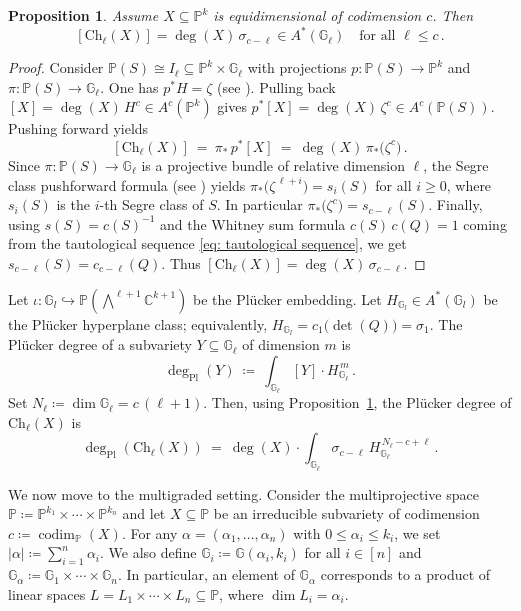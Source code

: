 \documentclass[12pt]{article}
\newtheorem{proposition}[theorem]{Proposition}
\theoremstyle{definition}
\newcommand{\C}{{\mathbb C}}
\newcommand{\G}{{\mathbb G}}
\newcommand{\PP}{{\mathbb P}}
\def\codim{\operatorname{codim}}
\begin{document}
\begin{proposition}\label{prop:class-single}
Assume $X\subseteq \PP^k$ is equidimensional of codimension $c$. Then
\[
    [\mathrm{Ch}_\ell(X)] = \deg(X)\,\sigma_{c-\ell}\in A^*(\G_\ell)\quad\text{for all $\ell\le c$}\,.
\]
\end{proposition}
\begin{proof}
Consider $\PP(S)\cong I_\ell \subseteq \PP^k\times\G_\ell$ with projections $p\colon\PP(S)\to \PP^k$ and $\pi\colon\PP(S)\to\G_\ell$.
One has $p^*H=\zeta$ (see \cite[Section 9.3.1]{EH}).
Pulling back $[X]=\deg(X)\,H^c\in A^c(\PP^k)$ gives $p^*[X] = \deg(X)\,\zeta^c\in A^c(\PP(S))$. Pushing forward yields
\[
    [\mathrm{Ch}_\ell(X)] \ =\  \pi_*\, p^*[X] \ =\  \deg(X)\,\pi_*\bigl(\zeta^c\bigr)\,.
\]
Since $\pi\colon\PP(S)\to\G_\ell$ is a projective bundle of relative dimension $\ell$, the Segre class pushforward formula (see \cite[\S3.3 and \S14]{fulton1998intersection}) yields $\pi_*\bigl(\zeta^{\,\ell+i}\bigr)= s_i(S)$ for all $i\ge 0$, where $s_i(S)$ is the $i$-th Segre class of $S$.
In particular $\pi_*\bigl(\zeta^c\bigr)= s_{c-\ell}(S)$.
Finally, using $s(S)=c(S)^{-1}$ and the Whitney sum formula $c(S)\,c(Q)=1$ coming from the tautological sequence \eqref{eq: tautological sequence}, we get $s_{c-\ell}(S)=c_{c-\ell}(Q)$. Thus $[\mathrm{Ch}_\ell(X)]=\deg(X)\,\sigma_{c-\ell}$.
\end{proof}

Let $\iota\colon\G_l\hookrightarrow \PP(\bigwedge^{\ell+1}\C^{k+1})$ be the Pl\"ucker embedding.
Let $H_{\G_l}\in A^*(\G_l)$ be the Pl\"ucker hyperplane class; equivalently, $H_{\G_l} = c_1\bigl(\det(Q)\bigr)=\sigma_1$. The Pl\"ucker degree of a subvariety $Y\subseteq\G_\ell$ of dimension $m$ is
\[
    \deg_{\mathrm{Pl}}(Y) \ \coloneqq\  \int_{\G_\ell} [Y]\cdot H_{\G_\ell}^{\,m}\,.
\]
Set $N_\ell\coloneqq\dim\G_\ell=c\,(\ell+1)$.
Then, using Proposition~\ref{prop:class-single}, the Pl\"ucker degree of $\mathrm{Ch}_\ell(X)$ is
\[
    \deg_{\mathrm{Pl}}(\mathrm{Ch}_\ell(X)) \ =\  \deg(X)\cdot \int_{\G_\ell} \sigma_{c-\ell}\, H_{\G_\ell}^{\,N_\ell-c+\ell}\,.
\]

\bigskip

We now move to the multigraded setting. Consider the multiprojective space $\PP \coloneqq \PP^{k_1}\times\cdots\times \PP^{k_n}$ and let $X\subseteq\PP$ be an irreducible subvariety of codimension $c\coloneqq\codim_{\PP}(X)$.
For any $\alpha=(\alpha_1,\dots,\alpha_n)$ with $0\le \alpha_i\le k_i$, we set $|\alpha|\coloneqq\sum_{i=1}^n\alpha_i$. We also define $\G_i\coloneqq\G(\alpha_i,k_i)$ for all $i\in[n]$ and $\G_\alpha\coloneqq\G_1\times\cdots\times\G_n$.
In particular, an element of $\G_\alpha$ corresponds to a product of linear spaces $L=L_1\times\cdots\times L_n\subseteq \PP$, where $\dim L_i=\alpha_i$.
\end{document}
